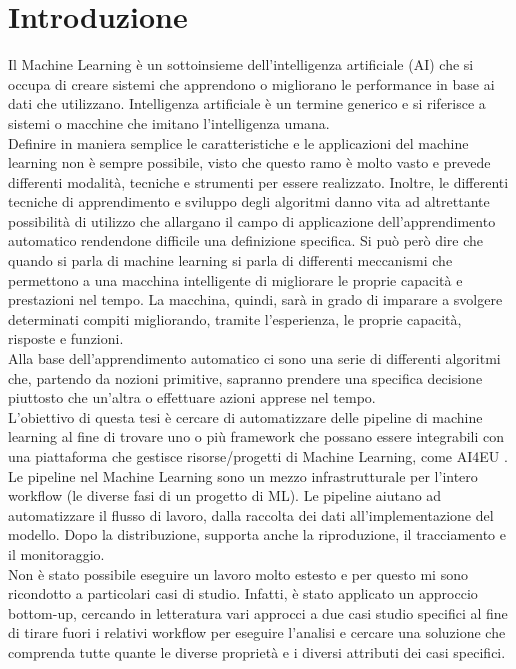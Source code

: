 \documentclass[12pt,a4paper]{report}
\begin{document}
\chapter{Introduzione}
\par
Il Machine Learning è un sottoinsieme dell'intelligenza artificiale (AI) che si occupa di creare sistemi che apprendono o migliorano le performance in base ai dati che utilizzano. Intelligenza artificiale è un termine generico e si riferisce a sistemi o macchine che imitano l'intelligenza umana.\\
Definire in maniera semplice le caratteristiche e le applicazioni del machine learning non è sempre possibile, visto che questo ramo è molto vasto e prevede differenti modalità, tecniche e strumenti per essere realizzato. Inoltre, le differenti tecniche di apprendimento e sviluppo degli algoritmi danno vita ad altrettante possibilità di utilizzo che allargano il campo di applicazione dell’apprendimento automatico rendendone difficile una definizione specifica. Si può però dire che quando si parla di machine learning si parla di differenti meccanismi che permettono a una macchina intelligente di migliorare le proprie capacità e prestazioni nel tempo. La macchina, quindi, sarà in grado di imparare a svolgere determinati compiti migliorando, tramite l’esperienza, le proprie capacità, risposte e funzioni.\\
Alla base dell’apprendimento automatico ci sono una serie di differenti algoritmi che, partendo da nozioni primitive, sapranno prendere una specifica decisione piuttosto che un’altra o effettuare azioni apprese nel tempo.\\
L'obiettivo di questa tesi è cercare di automatizzare delle pipeline di machine learning al fine di trovare uno o più framework che possano essere integrabili con una piattaforma che gestisce risorse/progetti di Machine Learning, come AI4EU \cite{AI4EU}.\\
Le pipeline nel Machine Learning sono un mezzo infrastrutturale per l'intero workflow (le diverse fasi di un progetto di ML). Le pipeline aiutano ad automatizzare il flusso di lavoro, dalla raccolta dei dati all'implementazione del modello. Dopo la distribuzione, supporta anche la riproduzione, il tracciamento e il monitoraggio.\\
Non è stato possibile eseguire un lavoro molto estesto e per questo mi sono ricondotto a particolari casi di studio. 
Infatti, è stato applicato un approccio bottom-up, cercando in letteratura vari approcci a due casi studio specifici al fine di tirare fuori i relativi workflow per eseguire l'analisi e cercare una soluzione che comprenda tutte quante le diverse proprietà e i diversi attributi dei casi specifici.\\
\end{document}
